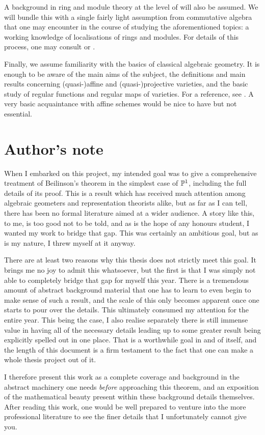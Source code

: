 A background in ring and module theory at the level of
\cite[Chapters~8~and~10]{dummit_and_foote} will also be assumed.
We will bundle this with a single fairly light assumption from
commutative algebra that one may encounter in the course of studying
the aforementioned topics: a working knowledge of localisations of
rings and modules.
For details of this process, one may consult
\cite[Chapter~3]{atiyah_macdonald} or \cite[Section~15.4]{dummit_and_foote}.

Finally, we assume familiarity with the basics of classical algebraic geometry.
It is enough to be aware of the main aims of the subject, the
definitions and main results concerning (quasi-)affine and
(quasi-)projective varieties, and the basic study of regular
functions and regular maps of varieties.
For a reference, see \cite[Sections~I.1--4]{hartshorne}.
A very basic acquaintance with affine schemes would be nice to have
but not essential.

\section{Author's note}

When I embarked on this project, my intended goal was to give a
comprehensive treatment of Beilinson's theorem in the simplest case
of $\mathbb{P}^{{1}}$, including the full details of its proof.
This is a result which has received much attention among algebraic
geometers and representation theorists alike, but as far as I can
tell, there has been no formal literature aimed at a wider audience.
A story like this, to me, is too good not to be told, and as is the
hope of any honours student, I wanted my work to bridge that gap.
This was certainly an ambitious goal, but as is my nature, I threw
myself at it anyway.

There are at least two reasons why this thesis does not strictly meet this goal.
It brings me no joy to admit this whatsoever, but the first is that I
was simply not able to completely bridge that gap for myself this year.
There is a tremendous amount of abstract background material that one
has to learn to even begin to make sense of such a result, and the
scale of this only becomes apparent once one starts to pour over the details.
This ultimately consumed my attention for the entire year.
This being the case, I also realise separately there is still immense
value in having all of the necessary details leading up to some
greater result being explicitly spelled out in one place.
That is a worthwhile goal in and of itself, and the length of this
document is a firm testament to the fact that one can make a whole
thesis project out of it.

I therefore present this work as a complete coverage and background
in the abstract machinery one needs \emph{before} approaching this
theorem, and an exposition of the mathematical beauty present within
these background details themselves.
After reading this work, one would be well prepared to venture into
the more professional literature to see the finer details that I
unfortunately cannot give you.
